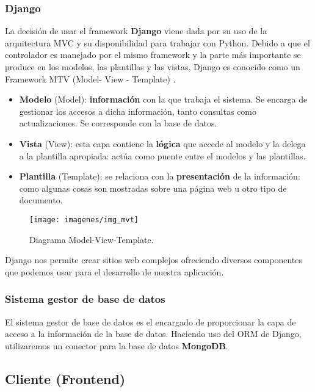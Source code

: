\hfill\begin{minipage}{\dimexpr\textwidth-1cm}
	\subsubsection{Django}
	La decisión de usar el framework \textbf{Django} viene dada por su uso de la arquitectura MVC y su disponibilidad para trabajar con Python. Debido a que el controlador es manejado por el mismo framework y la parte más importante se produce en los modelos, las plantillas y las vistas, Django es conocido como un Framework MTV (Model- View - Template) \cite{cita_mvt}.
	\begin{itemize}
		\item \textbf{Modelo} (Model): \textbf{información} con la que trabaja el sistema. Se encarga de gestionar los accesos a dicha información, tanto consultas como actualizaciones. Se corresponde con la base de datos.
		\item \textbf{Vista} (View): esta capa contiene la \textbf{lógica} que accede al modelo y la delega a la plantilla apropiada: actúa como puente entre el modelos y las plantillas.
		\item \textbf{Plantilla} (Template): se relaciona con la \textbf{presentación} de la información: como algunas cosas son mostradas sobre una página web u otro tipo de documento. \\
	\end{itemize}
	
	\begin{figure}[H]
		\centering
		\texttt{[image: imagenes/img\_mvt]}
		\caption{Diagrama Model-View-Template.}
		\label{fig:img_mvt}
	\end{figure}
	
	Django nos permite crear sitios web complejos ofreciendo diversos componentes que podemos usar para el desarrollo de nuestra aplicación.
	
	\subsubsection{Sistema gestor de base de datos}
	El sistema gestor de base de datos es el encargado de proporcionar la capa de acceso a la información de la base de datos. Haciendo uso del ORM de Django, utilizaremos un conector para la base de datos \textbf{MongoDB}.
\end{minipage}

\subsection{Cliente (Frontend)}

\newpage

